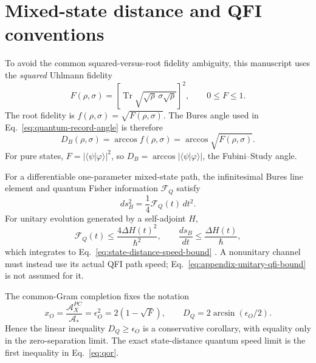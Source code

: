 \documentclass[11pt]{article}
\begin{document}
\appendix
\section{Mixed-state distance and QFI conventions}
\label{app:bures-qfi}

To avoid the common squared-versus-root fidelity ambiguity, this manuscript
uses the \emph{squared} Uhlmann fidelity
\begin{equation}
  F(\rho,\sigma)
  =\left[\operatorname{Tr}
  \sqrt{\sqrt\rho\,\sigma\sqrt\rho}\right]^2,
  \qquad 0\leq F\leq1.
  \label{eq:appendix-squared-fidelity}
\end{equation}
The root fidelity is
\(f(\rho,\sigma)=\sqrt{F(\rho,\sigma)}\).  The Bures angle used in
Eq.~\eqref{eq:quantum-record-angle} is therefore
\begin{equation}
  D_B(\rho,\sigma)=\arccos f(\rho,\sigma)
  =\arccos\sqrt{F(\rho,\sigma)}.
  \label{eq:appendix-bures-angle}
\end{equation}
For pure states, \(F=|\langle\psi|\varphi\rangle|^2\), so
\(D_B=\arccos|\langle\psi|\varphi\rangle|\), the Fubini--Study angle.

For a differentiable one-parameter mixed-state path, the infinitesimal Bures
line element and quantum Fisher information \(\mathcal F_Q\) satisfy
\begin{equation}
  ds_B^2=\frac14\mathcal F_Q(t)\,dt^2.
  \label{eq:appendix-bures-qfi}
\end{equation}
For unitary evolution generated by a self-adjoint \(H\),
\begin{equation}
  \mathcal F_Q(t)\leq\frac{4\Delta H(t)^2}{\hbar^2},
  \qquad
  \frac{ds_B}{dt}\leq\frac{\Delta H(t)}{\hbar},
  \label{eq:appendix-unitary-qfi-bound}
\end{equation}
which integrates to Eq.~\eqref{eq:state-distance-speed-bound}
\cite{Taddei2013}.  A nonunitary channel must instead use its actual QFI path
speed; Eq.~\eqref{eq:appendix-unitary-qfi-bound} is not assumed for it.

The common-Gram completion fixes the notation
\[
 x_O=\frac{\mathcal A_X^{PC}}{\mathcal A_*}
 =\epsilon_O^2=2(1-\sqrt F),
 \qquad
 D_Q=2\arcsin(\epsilon_O/2).
\]
Hence the linear inequality
\(D_Q\geq\epsilon_O\) is a conservative corollary, with equality only in the
zero-separation limit.  The exact state-distance quantum speed limit is the
first inequality in Eq.~\eqref{eq:qor}.





\end{document}
